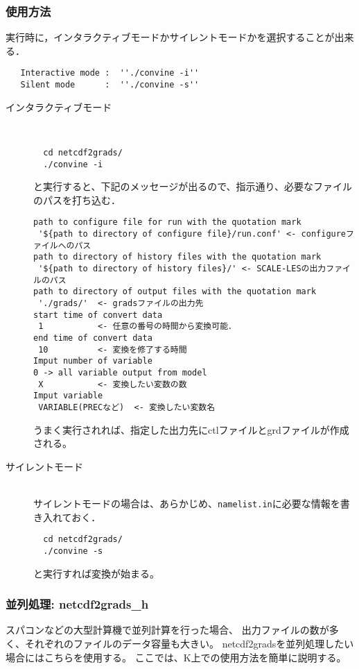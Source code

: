 \subsubsection{使用方法}
実行時に，インタラクティブモードかサイレントモードかを選択することが出来る．
\begin{verbatim}
   Interactive mode :  ''./convine -i''
   Silent mode      :  ''./convine -s''
\end{verbatim}
\begin{description}
\item[インタラクティブモード]\mbox{}\\
\begin{verbatim}
  cd netcdf2grads/
  ./convine -i
\end{verbatim}
と実行すると、下記のメッセージが出るので、指示通り、必要なファイルのパスを打ち込む．
\begin{verbatim}
path to configure file for run with the quotation mark
 '${path to directory of configure file}/run.conf' <- configureファイルへのパス
path to directory of history files with the quotation mark
 '${path to directory of history files}/' <- SCALE-LESの出力ファイルのパス
path to directory of output files with the quotation mark
 './grads/'  <- gradsファイルの出力先
start time of convert data
 1           <- 任意の番号の時間から変換可能． 
end time of convert data
 10          <- 変換を修了する時間
Imput number of variable
0 -> all variable output from model
 X           <- 変換したい変数の数
Imput variable
 VARIABLE(PRECなど)  <- 変換したい変数名
\end{verbatim}
うまく実行されれば、指定した出力先にctlファイルとgrdファイルが作成される。
\item[サイレントモード]\mbox{}\\
サイレントモードの場合は、あらかじめ、\verb|namelist.in|に必要な情報を書き入れておく．
\begin{verbatim}
  cd netcdf2grads/
  ./convine -s
\end{verbatim}
と実行すれば変換が始まる。
\end{description}



\subsubsection{並列処理: netcdf2grads\_h}

スパコンなどの大型計算機で並列計算を行った場合、
出力ファイルの数が多く、それぞれのファイルのデータ容量も大きい。
netcdf2gradsを並列処理したい場合にはこちらを使用する。
ここでは、K上での使用方法を簡単に説明する。

